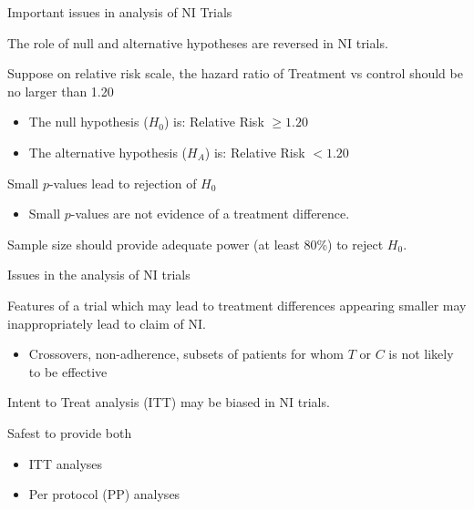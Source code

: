 \documentclass[ignorenonframetext,]{beamer}
\providecommand{\tightlist}{%
  \setlength{\itemsep}{0pt}\setlength{\parskip}{0pt}}
\begin{document}
\begin{frame}{Important issues in analysis of NI Trials}
\protect\hypertarget{important-issues-in-analysis-of-ni-trials}{}

The role of null and alternative hypotheses are reversed in NI trials.

Suppose on relative risk scale, the hazard ratio of Treatment vs control
should be no larger than 1.20

\begin{itemize}
\item
  The null hypothesis (\(H_0\)) is: Relative Risk \(\ge 1.20\)
\item
  The alternative hypothesis (\(H_A\)) is: Relative Risk \(< 1.20\)
\end{itemize}

Small \(p\)-values lead to rejection of \(H_0\)

\begin{itemize}
\tightlist
\item
  Small \(p\)-values are not evidence of a treatment difference.
\end{itemize}

Sample size should provide adequate power (at least 80\%) to reject
\(H_0\).

\end{frame}

\begin{frame}{Issues in the analysis of NI trials}
\protect\hypertarget{issues-in-the-analysis-of-ni-trials}{}

Features of a trial which may lead to treatment differences appearing
smaller may inappropriately lead to claim of NI.

\begin{itemize}
\tightlist
\item
  Crossovers, non-adherence, subsets of patients for whom \(T\) or \(C\)
  is not likely to be effective
\end{itemize}

Intent to Treat analysis (ITT) may be biased in NI trials.

Safest to provide both

\begin{itemize}
\item
  ITT analyses
\item
  Per protocol (PP) analyses
\end{itemize}

\end{frame}
\end{document}
